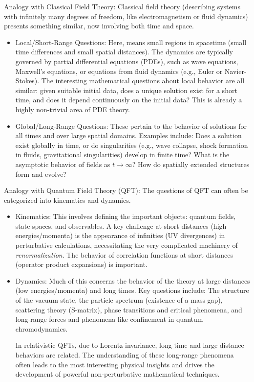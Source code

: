 \begin{remark}
Analogy with Classical Field Theory: Classical field theory (describing systems with infinitely many degrees of freedom, like electromagnetism or fluid dynamics) presents something similar, now involving both time and space.
\begin{itemize}
\item Local/Short-Range Questions: Here,  means small regions in spacetime (small time differences and small spatial distances). The dynamics are typically governed by partial differential equations (PDEs), such as wave equations, Maxwell's equations, or equations from fluid dynamics (e.g., Euler or Navier-Stokes). The interesting mathematical questions about local behavior are all similar: given suitable initial data, does a unique solution exist for a short time, and does it depend continuously on the initial data? This is already a highly non-trivial area of PDE theory.
\item Global/Long-Range Questions: These pertain to the behavior of solutions for all times and over large spatial domains. Examples include: Does a solution exist globally in time, or do singularities (e.g., wave collapse, shock formation in fluids, gravitational singularities) develop in finite time? What is the asymptotic behavior of fields as $t \to \infty$? How do spatially extended structures form and evolve?
\end{itemize}

Analogy with Quantum Field Theory (QFT): The questions of QFT can often be categorized into kinematics and dynamics.
\begin{itemize}
\item Kinematics: This involves defining the important objects: quantum fields, state spaces, and observables. A key challenge at short distances (high energies/momenta) is the appearance of infinities (UV divergences) in perturbative calculations, necessitating the very complicated machinery of \emph{renormalization}. The behavior of correlation functions at short distances (operator product expansions) is important.
\item Dynamics: Much of this concerns the behavior of the theory at large distances (low energies/momenta) and long times. Key questions include: The structure of the vacuum state, the particle spectrum (existence of a mass gap), scattering theory (S-matrix), phase transitions and critical phenomena, and long-range forces and phenomena like confinement in quantum chromodynamics.

In relativistic QFTs, due to Lorentz invariance, long-time and large-distance behaviors are related. The understanding of these long-range phenomena often leads to the most interesting physical insights and drives the development of powerful non-perturbative mathematical techniques.
\end{itemize}


\end{remark}
